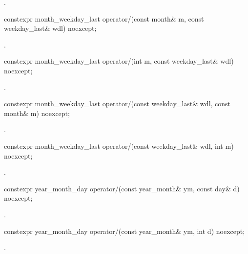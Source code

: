 \begin{itemdescr}
\pnum
\returns
{}.
\end{itemdescr}

\begin{itemdecl}
constexpr month_weekday_last
  operator/(const month& m, const weekday_last& wdl) noexcept;
\end{itemdecl}

\begin{itemdescr}
\pnum
\returns
{}.
\end{itemdescr}

\begin{itemdecl}
constexpr month_weekday_last
  operator/(int m, const weekday_last& wdl) noexcept;
\end{itemdecl}

\begin{itemdescr}
\pnum
\returns
{}.
\end{itemdescr}

\begin{itemdecl}
constexpr month_weekday_last
  operator/(const weekday_last& wdl, const month& m) noexcept;
\end{itemdecl}

\begin{itemdescr}
\pnum
\returns
{}.
\end{itemdescr}

\begin{itemdecl}
constexpr month_weekday_last
  operator/(const weekday_last& wdl, int m) noexcept;
\end{itemdecl}

\begin{itemdescr}
\pnum
\returns
{}.
\end{itemdescr}

\begin{itemdecl}
constexpr year_month_day
  operator/(const year_month& ym, const day& d) noexcept;
\end{itemdecl}

\begin{itemdescr}
\pnum
\returns
{}.
\end{itemdescr}

\begin{itemdecl}
constexpr year_month_day
  operator/(const year_month& ym, int d) noexcept;
\end{itemdecl}

\begin{itemdescr}
\pnum
\returns
{}.
\end{itemdescr}

